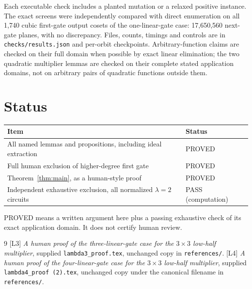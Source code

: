 \documentclass[11pt,a4paper]{article}
\begin{document}
Each executable check includes a planted mutation or a relaxed positive instance. The exact screens were independently compared with direct enumeration on all 1,740 cubic first-gate output cosets of the one-linear-gate case: 17,650,560 next-gate planes, with no discrepancy. Files, counts, timings and controls are in \texttt{checks/results.json} and per-orbit checkpoints. Arbitrary-function claims are checked on their full domain when possible by exact linear elimination; the two quadratic multiplier lemmas are checked on their complete stated application domains, not on arbitrary pairs of quadratic functions outside them.

\section{Status}
\begin{center}\begin{tabularx}{\textwidth}{@{}X l@{}}\toprule
Item & Status\\\midrule
All named lemmas and propositions, including ideal extraction & PROVED\\
Full human exclusion of higher-degree first gate & PROVED\\
Theorem~\ref{thm:main}, as a human-style proof & PROVED\\
Independent exhaustive exclusion, all normalized $\lambda=2$ circuits & PASS (computation)\\\bottomrule
\end{tabularx}\end{center}
PROVED means a written argument here plus a passing exhaustive check of its exact application domain. It does not certify human review.

\begin{thebibliography}{9}
 [L3] \emph{A human proof of the three-linear-gate case for the $3\times3$ low-half multiplier}, supplied \texttt{lambda3\_proof.tex}, unchanged copy in \texttt{references/}.
 [L4] \emph{A human proof of the four-linear-gate case for the $3\times3$ low-half multiplier}, supplied \texttt{lambda4\_proof (2).tex}, unchanged copy under the canonical filename in \texttt{references/}.
\end{thebibliography}
\end{document}
